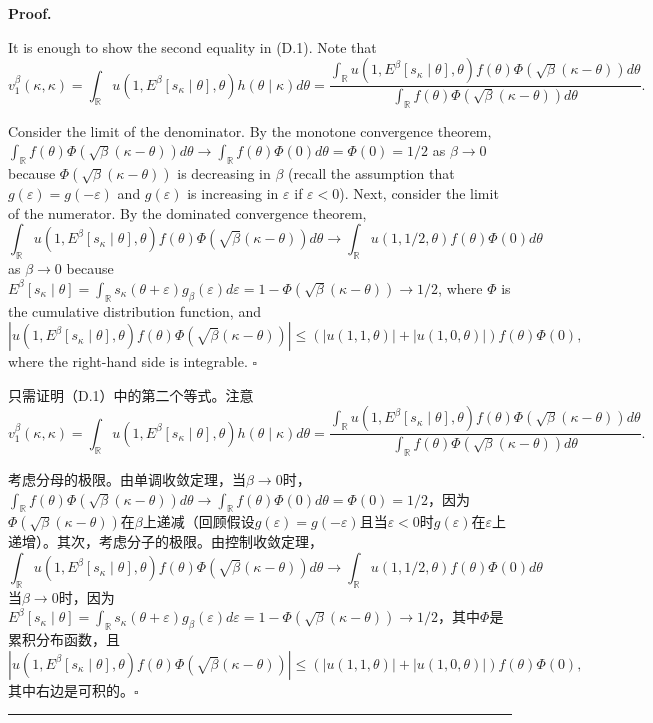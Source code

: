 \documentclass[12pt,a4paper]{article}
\newenvironment{original}
  {\par\medskip\noindent\color{black}\ignorespaces}
  {\par\medskip}
\newenvironment{translation}
  {\par\noindent\color{darkblue}\ignorespaces}
  {\par\medskip\noindent\hrule\par\medskip}
\theoremstyle{definition}
\theoremstyle{remark}
\begin{document}
\medskip
\noindent\textbf{Proof.}
\begin{original}
It is enough to show the second equality in (D.1). Note that
\[
v_1^\beta(\kappa, \kappa) = \int_{\mathbb{R}} u(1, E^\beta[s_\kappa \mid \theta], \theta) h(\theta \mid \kappa) d\theta = \frac{\int_{\mathbb{R}} u(1, E^\beta[s_\kappa \mid \theta], \theta) f(\theta) \Phi(\sqrt{\beta}(\kappa - \theta)) d\theta}{\int_{\mathbb{R}} f(\theta) \Phi(\sqrt{\beta}(\kappa - \theta)) d\theta}.
\]

Consider the limit of the denominator. By the monotone convergence theorem, $\int_{\mathbb{R}} f(\theta) \Phi(\sqrt{\beta}(\kappa - \theta)) d\theta \to \int_{\mathbb{R}} f(\theta) \Phi(0) d\theta = \Phi(0) = 1/2$ as $\beta \to 0$ because $\Phi(\sqrt{\beta}(\kappa - \theta))$ is decreasing in $\beta$ (recall the assumption that $g(\varepsilon) = g(-\varepsilon)$ and $g(\varepsilon)$ is increasing in $\varepsilon$ if $\varepsilon < 0$). Next, consider the limit of the numerator. By the dominated convergence theorem,
\[
\int_{\mathbb{R}} u(1, E^\beta[s_\kappa \mid \theta], \theta) f(\theta) \Phi(\sqrt{\beta}(\kappa - \theta)) d\theta \to \int_{\mathbb{R}} u(1, 1/2, \theta) f(\theta) \Phi(0) d\theta
\]
as $\beta \to 0$ because $E^\beta[s_\kappa \mid \theta] = \int_{\mathbb{R}} s_\kappa(\theta + \varepsilon) g_\beta(\varepsilon) d\varepsilon = 1 - \Phi(\sqrt{\beta}(\kappa - \theta)) \to 1/2$, where $\Phi$ is the cumulative distribution function, and
\[
|u(1, E^\beta[s_\kappa \mid \theta], \theta) f(\theta) \Phi(\sqrt{\beta}(\kappa - \theta))| \le (|u(1, 1, \theta)| + |u(1, 0, \theta)|) f(\theta) \Phi(0),
\]
where the right-hand side is integrable. $\square$
\end{original}
\begin{translation}
只需证明（D.1）中的第二个等式。注意
\[
v_1^\beta(\kappa, \kappa) = \int_{\mathbb{R}} u(1, E^\beta[s_\kappa \mid \theta], \theta) h(\theta \mid \kappa) d\theta = \frac{\int_{\mathbb{R}} u(1, E^\beta[s_\kappa \mid \theta], \theta) f(\theta) \Phi(\sqrt{\beta}(\kappa - \theta)) d\theta}{\int_{\mathbb{R}} f(\theta) \Phi(\sqrt{\beta}(\kappa - \theta)) d\theta}.
\]

考虑分母的极限。由单调收敛定理，当$\beta \to 0$时，$\int_{\mathbb{R}} f(\theta) \Phi(\sqrt{\beta}(\kappa - \theta)) d\theta \to \int_{\mathbb{R}} f(\theta) \Phi(0) d\theta = \Phi(0) = 1/2$，因为$\Phi(\sqrt{\beta}(\kappa - \theta))$在$\beta$上递减（回顾假设$g(\varepsilon) = g(-\varepsilon)$且当$\varepsilon < 0$时$g(\varepsilon)$在$\varepsilon$上递增）。其次，考虑分子的极限。由控制收敛定理，
\[
\int_{\mathbb{R}} u(1, E^\beta[s_\kappa \mid \theta], \theta) f(\theta) \Phi(\sqrt{\beta}(\kappa - \theta)) d\theta \to \int_{\mathbb{R}} u(1, 1/2, \theta) f(\theta) \Phi(0) d\theta
\]
当$\beta \to 0$时，因为$E^\beta[s_\kappa \mid \theta] = \int_{\mathbb{R}} s_\kappa(\theta + \varepsilon) g_\beta(\varepsilon) d\varepsilon = 1 - \Phi(\sqrt{\beta}(\kappa - \theta)) \to 1/2$，其中$\Phi$是累积分布函数，且
\[
|u(1, E^\beta[s_\kappa \mid \theta], \theta) f(\theta) \Phi(\sqrt{\beta}(\kappa - \theta))| \le (|u(1, 1, \theta)| + |u(1, 0, \theta)|) f(\theta) \Phi(0),
\]
其中右边是可积的。$\square$
\end{translation}
\end{document}
